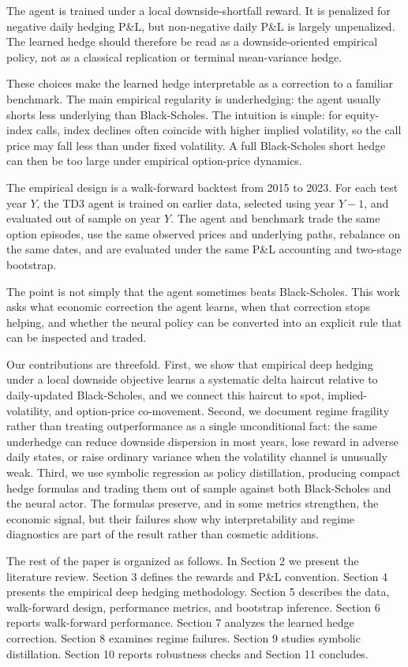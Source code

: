 \documentclass[a4paper,12pt]{article}
\numberwithin{equation}{section}
\begin{document}
The agent is trained under a local downside-shortfall reward. It is penalized for negative daily hedging P\&L, but non-negative daily P\&L is largely unpenalized. The learned hedge should therefore be read as a downside-oriented empirical policy, not as a classical replication or terminal mean-variance hedge.

These choices make the learned hedge interpretable as a correction to a familiar benchmark. The main empirical regularity is underhedging: the agent usually shorts less underlying than Black-Scholes. The intuition is simple: for equity-index calls, index declines often coincide with higher implied volatility, so the call price may fall less than under fixed volatility. A full Black-Scholes short hedge can then be too large under empirical option-price dynamics.

The empirical design is a walk-forward backtest from 2015 to 2023. For each test year $Y$, the TD3 agent is trained on earlier data, selected using year $Y-1$, and evaluated out of sample on year $Y$. The agent and benchmark trade the same option episodes, use the same observed prices and underlying paths, rebalance on the same dates, and are evaluated under the same P\&L accounting and two-stage bootstrap.


The point is not simply that the agent sometimes beats Black-Scholes. This work asks what economic correction the agent learns, when that correction stops helping, and whether the neural policy can be converted into an explicit rule that can be inspected and traded.

Our contributions are threefold. First, we show that empirical deep hedging under a local downside objective learns a systematic delta haircut relative to daily-updated Black-Scholes, and we connect this haircut to spot, implied-volatility, and option-price co-movement. Second, we document regime fragility rather than treating outperformance as a single unconditional fact: the same underhedge can reduce downside dispersion in most years, lose reward in adverse daily states, or raise ordinary variance when the volatility channel is unusually weak. Third, we use symbolic regression as policy distillation, producing compact hedge formulas and trading them out of sample against both Black-Scholes and the neural actor. The formulas preserve, and in some metrics strengthen, the economic signal, but their failures show why interpretability and regime diagnostics are part of the result rather than cosmetic additions.

The rest of the paper is organized as follows. In Section 2 we present the literature review. Section 3 defines the rewards and P\&L convention. Section 4 presents the empirical deep hedging methodology. Section 5 describes the data, walk-forward design, performance metrics, and bootstrap inference. Section 6 reports walk-forward performance. Section 7 analyzes the learned hedge correction. Section 8 examines regime failures. Section 9 studies symbolic distillation. Section 10 reports robustness checks and Section 11 concludes.
\end{document}
